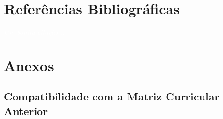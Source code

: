 \documentclass[11pt,fleqn]{book} %
\begin{document}
\chapter*{Referências Bibliográficas}\label{referencias}
\vspace{6em}
\begin{flushright}
	\textit{\textcolor{white}{Um bonita citação...}}
\end{flushright}
\vspace{12em}
\printbibliography[heading=bibempty]



%


\chapter{Anexos}\label{conheca}
\vspace{6em}
\begin{flushright}
	\textit{\textcolor{white}{}}
\end{flushright}
\vspace{12em}

\newpage
\section{Compatibilidade com a Matriz Curricular Anterior}
\indent
\end{document}
